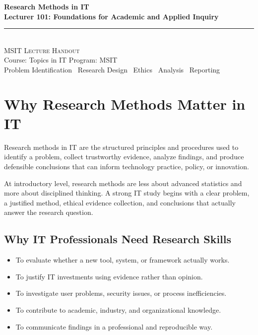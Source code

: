 \documentclass[11pt,a4paper]{article}
\begin{document}
\begin{center}
\vspace*{0.5cm}
{\Huge\bfseries\textcolor{primary}{Research Methods in IT}}\\[8pt]
{\Large\bfseries\textcolor{primary}{Lecturer 101: Foundations for Academic and Applied Inquiry}}\\[16pt]
{\color{secondary}\rule{0.74\textwidth}{1.5pt}}\\[12pt]
{\Large\textsc{MSIT Lecture Handout}}\\[6pt]
{\large\textcolor{gray!70!black}{Course: Topics in IT \quad Program: MSIT}}\\[8pt]
{\normalsize\textcolor{gray!70!black}{Problem Identification \textbullet\ Research Design \textbullet\ Ethics \textbullet\ Analysis \textbullet\ Reporting}}
\vspace{0.3cm}
\end{center}

\tableofcontents
\newpage

\section{Why Research Methods Matter in IT}

\begin{definitionbox}
Research methods in IT are the structured principles and procedures used to identify a problem, collect trustworthy evidence, analyze findings, and produce defensible conclusions that can inform technology practice, policy, or innovation.
\end{definitionbox}

\begin{conceptbox}
At introductory level, research methods are less about advanced statistics and more about disciplined thinking. A strong IT study begins with a clear problem, a justified method, ethical evidence collection, and conclusions that actually answer the research question.
\end{conceptbox}

\subsection{Why IT Professionals Need Research Skills}

\begin{itemize}[leftmargin=*]
  \item To evaluate whether a new tool, system, or framework actually works.
  \item To justify IT investments using evidence rather than opinion.
  \item To investigate user problems, security issues, or process inefficiencies.
  \item To contribute to academic, industry, and organizational knowledge.
  \item To communicate findings in a professional and reproducible way.
\end{itemize}
\end{document}
